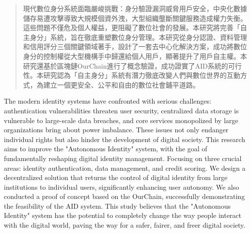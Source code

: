 
\begin{abstract}
  現代數位身分系統面臨嚴峻挑戰：身分驗證漏洞威脅用戶安全，中央化數據儲存易遭攻擊導致大規模個資外洩，大型組織壟斷關鍵服務造成權力失衡。這些問題不僅危及個人權益，更阻礙了數位社會的發展。本研究將完善「自主身分」系統，旨在徹底重塑數位身分管理。本研究從身分認證、資料管理和信用評分三個關鍵領域著手，設計了一套去中心化解決方案，成功將數位身分的控制權從大型機構手中歸還給個人用戶，顯著提升了用戶自主權。本研究還基於區塊鏈OurChain進行了概念驗證，成功證實了AID系統的可行性。本研究認為「自主身分」系統有潛力徹底改變人們與數位世界的互動方式，為建立一個更安全、公平和自由的數位社會鋪平道路。
\end{abstract}

\begin{abstract*}
  The modern identity systems have confronted with serious challenges: authentication vulnerabilities threaten user security, centralized data storage is vulnerable to large-scale data breaches, and core services monopolized by large organizations bring about power imbalance. These issues not only endanger individual rights but also hinder the development of digital society. This research aims to improve the "Autonomous Identity" system, with the goal of fundamentally reshaping digital identity management. Focusing on three crucial areas: identity authentication, data management, and credit scoring. We design a decentralized solution that returns the control of digital identity from large institutions to individual users, significantly enhancing user autonomy. We also conducted a proof of concept based on the OurChain, successfully demonstrating the feasibility of the AID system. This study believes that the "Autonomous Identity" system has the potential to completely change the way people interact with the digital world, paving the way for a safer, fairer, and freer digital society.
\end{abstract*}